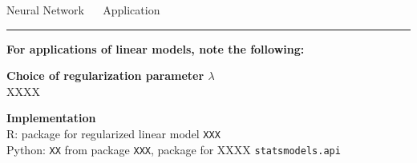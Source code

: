 \documentclass[11pt,compress,t,notes=noshow, xcolor=table]{beamer}
\begin{document}

\LARGE
\begin{frame}{\textcolor{gray!80}{Neural Network} ~~ Application}
\normalsize
\vspace{-0.5cm}
\noindent \textcolor{gray!80}{\rule{\textwidth}{1pt}}

\vspace{0.3cm}

\footnotesize

\textbf{For applications of linear models, note the following:}

\lz

  \textbf{\textcolor{gray!80}{Choice of regularization parameter  $\lambda$}} \\
  \smallskip
 XXXX
 
 

\lz

  \textbf{\textcolor{gray!80}{Implementation}} \\
  \smallskip
  R: package for regularized linear model \texttt{XXX}\\
  Python: \texttt{XX} from package \texttt{XXX}, package for XXXX \texttt{statsmodels.api}

\end{frame}


% 
\end{document}
